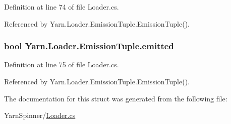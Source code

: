 Definition at line 74 of file Loader.\-cs.



Referenced by Yarn.\-Loader.\-Emission\-Tuple.\-Emission\-Tuple().

\hypertarget{a00093_a5916dbbd4d2e24ddfd02b0afdea290bf}{
\subsubsection[{emitted}]{\setlength{\rightskip}{0pt plus 5cm}bool Yarn.\-Loader.\-Emission\-Tuple.\-emitted}}\label{a00093_a5916dbbd4d2e24ddfd02b0afdea290bf}


Definition at line 75 of file Loader.\-cs.



Referenced by Yarn.\-Loader.\-Emission\-Tuple.\-Emission\-Tuple().



The documentation for this struct was generated from the following file\-:\begin{DoxyCompactItemize}
\item 
Yarn\-Spinner/\hyperlink{a00288}{Loader.\-cs}\end{DoxyCompactItemize}

